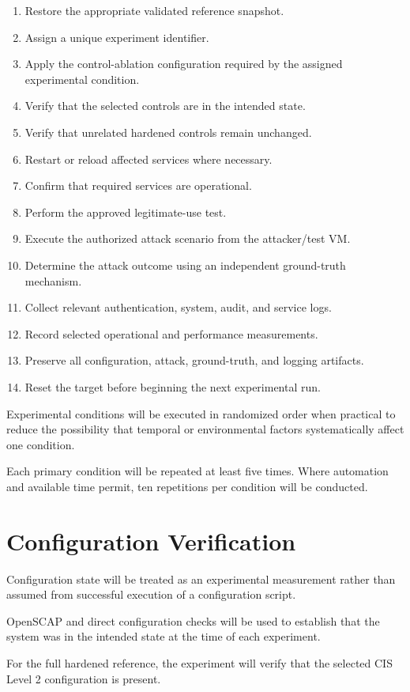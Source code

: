 \documentclass[11pt]{article}
\begin{document}
\begin{enumerate}
\item Restore the appropriate validated reference snapshot.
\item Assign a unique experiment identifier.
\item Apply the control-ablation configuration required by the assigned
experimental condition.
\item Verify that the selected controls are in the intended state.
\item Verify that unrelated hardened controls remain unchanged.
\item Restart or reload affected services where necessary.
\item Confirm that required services are operational.
\item Perform the approved legitimate-use test.
\item Execute the authorized attack scenario from the attacker/test VM.
\item Determine the attack outcome using an independent ground-truth
mechanism.
\item Collect relevant authentication, system, audit, and service logs.
\item Record selected operational and performance measurements.
\item Preserve all configuration, attack, ground-truth, and logging
artifacts.
\item Reset the target before beginning the next experimental run.
\end{enumerate}

Experimental conditions will be executed in randomized order when
practical to reduce the possibility that temporal or environmental
factors systematically affect one condition.

Each primary condition will be repeated at least five times. Where
automation and available time permit, ten repetitions per condition will
be conducted.
\section{Configuration Verification}
\label{sec:orgd1138b0}
Configuration state will be treated as an experimental measurement
rather than assumed from successful execution of a configuration script.

OpenSCAP and direct configuration checks will be used to establish that
the system was in the intended state at the time of each experiment.

For the full hardened reference, the experiment will verify that the
selected CIS Level 2 configuration is present.
\end{document}
